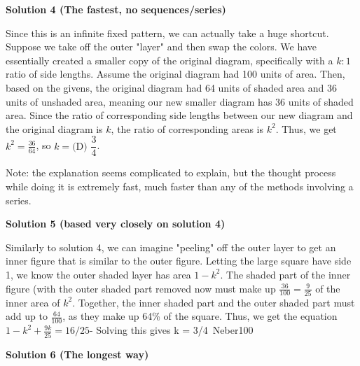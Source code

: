 \begin{enumerate}
\textbf{Solution 4 (The fastest, no sequences/series)}

Since this is an infinite fixed pattern, we can actually take a huge shortcut. Suppose we take off the outer "layer" and then swap the colors. We have essentially created a smaller copy of the original diagram, specifically with a $k:1$ ratio of side lengths. Assume the original diagram had 100 units of area. Then, based on the givens, the original diagram had 64 units of shaded area and 36 units of unshaded area, meaning our new smaller diagram has 36 units of shaded area. Since the ratio of corresponding side lengths between our new diagram and the original diagram is $k$, the ratio of corresponding areas is $k^2$. Thus, we get $k^2 = \frac{36}{64}$, so $k = \boxed{\text{(D) }\dfrac{3}{4}}$.

 Note: the explanation seems complicated to explain, but the thought process while doing it is extremely fast, much faster than any of the methods involving a series.

 


 



\textbf{Solution 5 (based very closely on solution 4)}

Similarly to solution 4, we can imagine "peeling" off the outer layer to get an inner figure that is similar to the outer figure. Letting the large square have side 1, we know the outer shaded layer has area $1-k^2$. The shaded part of the inner figure (with the outer shaded part removed now must make up $\frac{36}{100} = \frac{9}{25}$ of the inner area of $k^2$. Together, the inner shaded part and the outer shaded part must add up to $\frac{64}{100}$, as they make up 64\% of the square. Thus, we get the equation$1-k^2 + \frac{9k}{25} = 16/25$- Solving this gives k = 3/4~Neber100

 



\textbf{Solution 6 (The longest way)}


\end{enumerate}
